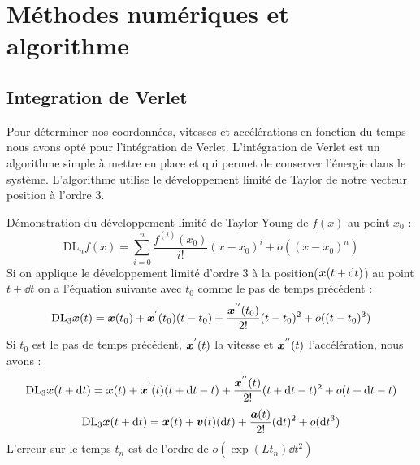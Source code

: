 \section{Méthodes numériques et algorithme}
    \subsection{Integration de Verlet}
        Pour déterminer nos coordonnées, vitesses et accélérations en fonction du temps nous avons opté pour l'intégration de Verlet. L'intégration de Verlet est un algorithme simple à mettre en place et qui permet de conserver l'énergie dans le système. L'algorithme utilise le développement limité de Taylor de notre vecteur position à l'ordre 3.

        Démonstration du développement limité de Taylor Young de $f(x)$ au point $x_0$\cite{agarwal_introduction_2011} :%
        \begin{equation}
            \mathrm{DL}_n f(x) = \sum_{i=0}^{n}\frac{f^{(i)}(x_0)}{i!}(x-x_0)^i+ o((x-x_0)^n)
        \end{equation}
        Si on applique le développement limité d'ordre 3 à la position($\vb*{x}(t+\mathrm{d}t)$) au point $t+\dd t$ on a l'équation suivante avec $t_0$ comme le pas de temps précédent :
        \begin{equation}
            \mathrm{DL}_3 \vb*{x}(t) = \vb*{x}(t_0)+\vb*{x}^{'}(t_0)(t-t_0)+\frac{\vb*{x}^{''}(t_0)}{2!}(t-t_0)^2 \\+o((t-t_0)^3)
        \end{equation}
        Si $t_0$ est le pas de temps précédent, $\vb*{x}^{'}(t)$ la vitesse et $\vb*{x}^{''}(t)$ l'accélération, nous avons :
        \begin{equation}
            \mathrm{DL}_3 \vb*{x}(t+\mathrm{d}t) = \vb*{x}(t)+\vb*{x}^{'}(t)(t+\mathrm{d}t-t)
            \\+\frac{\vb*{x}^{''}(t)}{2!}(t+\mathrm{d}t-t)^2+o(t+\mathrm{d}t-t)
            \label{eq:posx}
        \end{equation}
        \begin{equation}
             \mathrm{DL}_3 \vb*{x}(t+\mathrm{d}t)= \vb*{x}(t)+\vb*{v}(t)(\mathrm{d}t)+\frac{\vb*{a}(t)}{2!}(\mathrm{d}t)^2
             \\+o(\mathrm{d}t^3)
        \end{equation}
        L'erreur sur le temps $t_n$ est de l'ordre de $o(\exp(Lt_n)\dd t^2)$ %

